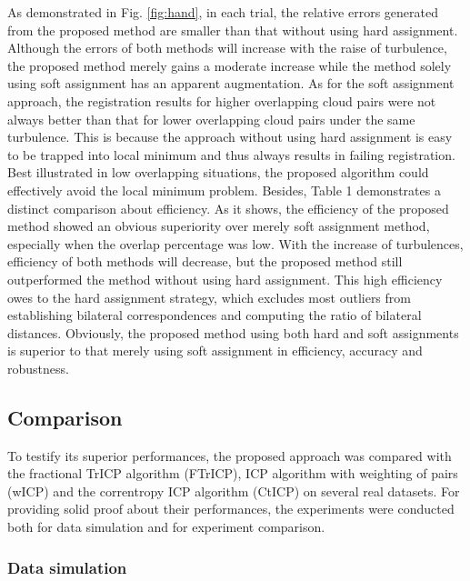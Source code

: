 \documentclass[review]{elsarticle}
\begin{document}
As demonstrated in Fig. \ref{fig:hand}, in each trial, the relative errors generated from the proposed method are smaller than that without using hard assignment. Although the errors of both methods will increase with the raise of turbulence, the proposed method merely gains a moderate increase while the method solely using soft assignment has an apparent augmentation. As for the soft assignment approach, the registration results for higher overlapping cloud pairs were not always better than that for lower overlapping cloud pairs under the same turbulence. This is because the approach without using hard assignment is easy to be trapped into local minimum and thus always results in failing registration. Best illustrated in low overlapping situations, the proposed algorithm could effectively avoid the local minimum problem. Besides, Table 1 demonstrates a distinct comparison about efficiency. As it shows, the efficiency of the proposed method showed an obvious superiority over merely soft assignment method, especially when the overlap percentage was low. With the increase of turbulences, efficiency of both methods will decrease, but the proposed method still outperformed the method without using hard assignment. This high efficiency owes to the hard assignment strategy, which excludes most outliers from establishing bilateral correspondences and computing the ratio of bilateral distances. Obviously, the proposed method using both hard and soft assignments is superior to that merely using soft assignment in efficiency, accuracy and robustness.





\subsection{Comparison}
To testify its superior performances, the proposed approach was compared with the fractional TrICP algorithm (FTrICP), ICP algorithm with weighting of pairs (wICP) \cite{Rusinkiewicz01} and the correntropy ICP algorithm (CtICP) on several real datasets. For providing solid proof about their performances, the experiments were conducted both for data simulation and for experiment comparison.

\subsubsection{Data simulation}
\end{document}
